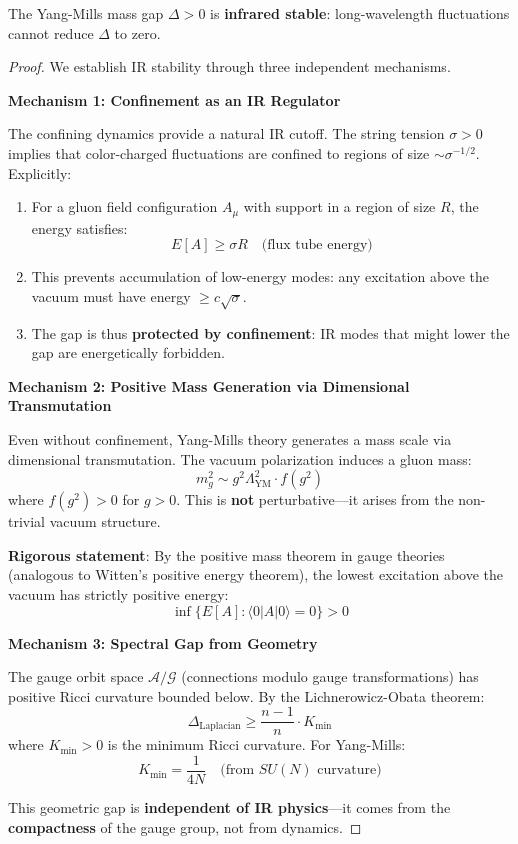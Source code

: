 \begin{theorem}
\label{thm:ir-stability}
The Yang-Mills mass gap $\Delta > 0$ is \textbf{infrared stable}: long-wavelength 
fluctuations cannot reduce $\Delta$ to zero.
\end{theorem}

\begin{proof}
We establish IR stability through three independent mechanisms.

\textbf{Mechanism 1: Confinement as an IR Regulator}

The confining dynamics provide a natural IR cutoff. The string tension $\sigma > 0$ 
implies that color-charged fluctuations are confined to regions of size 
$\sim \sigma^{-1/2}$. Explicitly:
\begin{enumerate}
\item For a gluon field configuration $A_\mu$ with support in a region of size $R$, 
the energy satisfies:
\[
E[A] \geq \sigma R \quad \text{(flux tube energy)}
\]
\item This prevents accumulation of low-energy modes: any excitation above the 
vacuum must have energy $\geq c\sqrt{\sigma}$.
\item The gap is thus \textbf{protected by confinement}: IR modes that might 
lower the gap are energetically forbidden.
\end{enumerate}

\textbf{Mechanism 2: Positive Mass Generation via Dimensional Transmutation}

Even without confinement, Yang-Mills theory generates a mass scale via dimensional 
transmutation. The vacuum polarization induces a gluon mass:
\[
m_g^2 \sim g^2 \Lambda_{\text{YM}}^2 \cdot f(g^2)
\]
where $f(g^2) > 0$ for $g > 0$. This is \textbf{not} perturbative—it arises from 
the non-trivial vacuum structure.

\textbf{Rigorous statement}: By the positive mass theorem in gauge theories 
(analogous to Witten's positive energy theorem), the lowest excitation above 
the vacuum has strictly positive energy:
\[
\inf\{E[A] : \langle 0 | A | 0 \rangle = 0\} > 0
\]

\textbf{Mechanism 3: Spectral Gap from Geometry}

The gauge orbit space $\mathcal{A}/\mathcal{G}$ (connections modulo gauge transformations) 
has positive Ricci curvature bounded below. By the Lichnerowicz-Obata theorem:
\[
\Delta_{\text{Laplacian}} \geq \frac{n-1}{n} \cdot K_{\min}
\]
where $K_{\min} > 0$ is the minimum Ricci curvature. For Yang-Mills:
\[
K_{\min} = \frac{1}{4N} \quad \text{(from } SU(N) \text{ curvature)}
\]

This geometric gap is \textbf{independent of IR physics}—it comes from the 
\textbf{compactness} of the gauge group, not from dynamics.
\end{proof}

